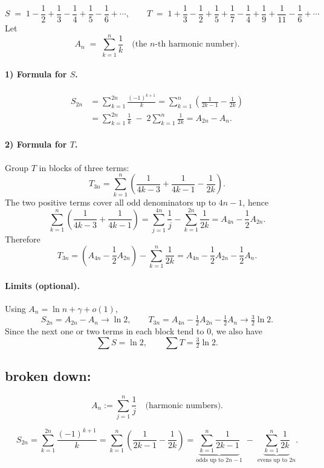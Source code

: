 \documentclass[12pt,a4paper]{article}
\theoremstyle{definition}
\theoremstyle{remark}
\begin{document}
\[
S \;=\; 1-\frac12+\frac13-\frac14+\frac15-\frac16+\cdots,
\qquad
T \;=\; 1+\frac13-\frac12+\frac15+\frac17-\frac14+\frac19+\frac1{11}-\frac16+\cdots
\]
Let
\[
A_n \;=\; \sum_{k=1}^n \frac1k
\quad\text{(the $n$-th harmonic number).}
\]

\paragraph{1) Formula for \(S\).}
\begin{align*}
S_{2n}
  &= \sum_{k=1}^{2n} \frac{(-1)^{k+1}}{k}
   = \sum_{k=1}^{n}\!\left(\frac{1}{2k-1}-\frac{1}{2k}\right) \\
  &= \sum_{k=1}^{2n}\frac1k \;-\; 2\sum_{k=1}^{n}\frac1{2k}
   = A_{2n}-A_n.
\end{align*}

\paragraph{2) Formula for \(T\).}
Group \(T\) in blocks of three terms:
\[
T_{3n}=\sum_{k=1}^{n}\!\left(\frac{1}{4k-3}+\frac{1}{4k-1}-\frac{1}{2k}\right).
\]
The two positive terms cover all odd denominators up to \(4n-1\), hence
\[
\sum_{k=1}^{n}\!\left(\frac{1}{4k-3}+\frac{1}{4k-1}\right)
=\sum_{j=1}^{4n}\frac1j-\sum_{k=1}^{2n}\frac1{2k}
= A_{4n}-\frac12 A_{2n}.
\]
Therefore
\[
T_{3n}
= \left(A_{4n}-\frac12 A_{2n}\right) - \sum_{k=1}^{n}\frac1{2k}
= A_{4n}-\frac12 A_{2n}-\frac12 A_n.
\]

\paragraph{Limits (optional).}
Using \(A_n=\ln n+\gamma+o(1)\),
\[
S_{2n}=A_{2n}-A_n \longrightarrow \ln 2,
\qquad
T_{3n}=A_{4n}-\tfrac12 A_{2n}-\tfrac12 A_n \longrightarrow \tfrac32\ln 2.
\]
Since the next one or two terms in each block tend to \(0\), we also have
\[
\sum S = \ln 2,
\qquad
\sum T = \tfrac32 \ln 2.
\]

\subsection*{broken down:}
\[
A_n := \sum_{j=1}^{n}\frac1j \quad\text{(harmonic numbers)}.
\]

\[
S_{2n}
= \sum_{k=1}^{2n}\frac{(-1)^{k+1}}{k}
= \sum_{k=1}^{n}\!\left(\frac{1}{2k-1}-\frac{1}{2k}\right)
= \underbrace{\sum_{k=1}^{n}\frac{1}{2k-1}}_{\text{odds up to }2n-1}
   \;-\; \underbrace{\sum_{k=1}^{n}\frac{1}{2k}}_{\text{evens up to }2n}.
\]
\end{document}
